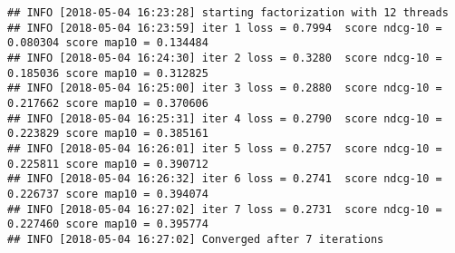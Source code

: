 \documentclass[]{article}
\newenvironment{Shaded}{\begin{snugshade}}{\end{snugshade}}
\newcommand{\KeywordTok}[1]{\textcolor[rgb]{0.13,0.29,0.53}{\textbf{#1}}}
\newcommand{\DataTypeTok}[1]{\textcolor[rgb]{0.13,0.29,0.53}{#1}}
\newcommand{\DecValTok}[1]{\textcolor[rgb]{0.00,0.00,0.81}{#1}}
\newcommand{\StringTok}[1]{\textcolor[rgb]{0.31,0.60,0.02}{#1}}
\newcommand{\CommentTok}[1]{\textcolor[rgb]{0.56,0.35,0.01}{\textit{#1}}}
\newcommand{\OperatorTok}[1]{\textcolor[rgb]{0.81,0.36,0.00}{\textbf{#1}}}
\newcommand{\NormalTok}[1]{#1}
\begin{document}
\begin{Shaded}
\end{Shaded}

\begin{verbatim}
## INFO [2018-05-04 16:23:28] starting factorization with 12 threads
## INFO [2018-05-04 16:23:59] iter 1 loss = 0.7994  score ndcg-10 = 0.080304 score map10 = 0.134484
## INFO [2018-05-04 16:24:30] iter 2 loss = 0.3280  score ndcg-10 = 0.185036 score map10 = 0.312825
## INFO [2018-05-04 16:25:00] iter 3 loss = 0.2880  score ndcg-10 = 0.217662 score map10 = 0.370606
## INFO [2018-05-04 16:25:31] iter 4 loss = 0.2790  score ndcg-10 = 0.223829 score map10 = 0.385161
## INFO [2018-05-04 16:26:01] iter 5 loss = 0.2757  score ndcg-10 = 0.225811 score map10 = 0.390712
## INFO [2018-05-04 16:26:32] iter 6 loss = 0.2741  score ndcg-10 = 0.226737 score map10 = 0.394074
## INFO [2018-05-04 16:27:02] iter 7 loss = 0.2731  score ndcg-10 = 0.227460 score map10 = 0.395774
## INFO [2018-05-04 16:27:02] Converged after 7 iterations
\end{verbatim}
\end{document}
